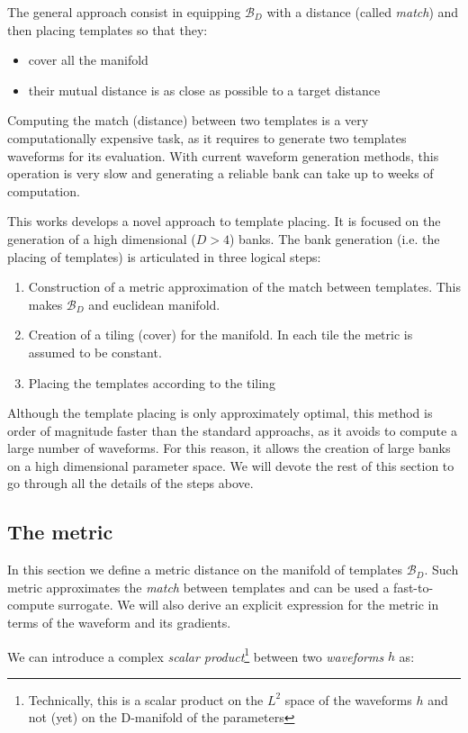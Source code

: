 \documentclass[twocolumn,showpacs,preprintnumbers,nofootinbib,prd,
superscriptaddress,10pt]{revtex4-2}
\begin{document}
The general approach consist in equipping $\mathcal{B}_D$ with a distance (called {\it match}) and then placing templates so that they:
\begin{itemize}
	\item cover all the manifold
	\item their mutual distance is as close as possible to a target distance
\end{itemize}
Computing the match (distance) between two templates is a very computationally expensive task, as it requires to generate two templates waveforms for its evaluation. With current waveform generation methods, this operation is very slow and generating a reliable bank can take up to weeks of computation.

This works develops a novel approach to template placing. It is focused on the generation of a high dimensional ($D>4$) banks.
The bank generation (i.e. the placing of templates) is articulated in three logical steps:

\begin{enumerate}
	\item Construction of a metric approximation of the match between templates. This makes $\mathcal{B}_D$ and euclidean manifold.
	\item Creation of a tiling (cover) for the manifold. In each tile the metric is assumed to be constant.
	\item Placing the templates according to the tiling
\end{enumerate}

Although the template placing is only approximately optimal, this method is order of magnitude faster than the standard approachs, as it avoids to compute a large number of waveforms. For this reason, it allows the creation of large banks on a high dimensional parameter space.
We will devote the rest of this section to go through all the details of the steps above.

\subsection{The metric} \label{sec:metric}

In this section we define a metric distance on the manifold of templates $\mathcal{B}_D$. Such metric approximates the {\it match} between templates and can be used a fast-to-compute surrogate. We will also derive an explicit expression for the metric in terms of the waveform and its gradients.

We can introduce a complex \textit{scalar product}\footnote{
Technically, this is a scalar product on the $L^2$ space of the waveforms $h$ and not (yet) on the D-manifold of the parameters
} between two \textit{waveforms} $h$ as:
\end{document}
